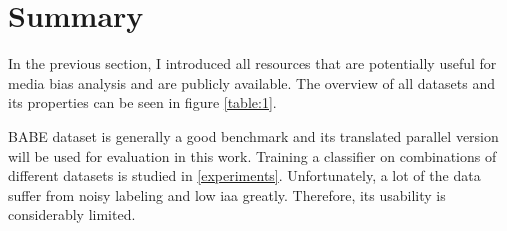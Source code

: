 \section{Summary}
In the previous section, I introduced all resources that are potentially useful for media bias analysis and are publicly available. The overview of all datasets and its properties can be seen in figure \ref{table:1}.

BABE dataset is generally a good benchmark and its translated parallel version will be used for evaluation in this work. Training a classifier on combinations of different datasets is studied in \ref{experiments}. Unfortunately, a lot of the data suffer from noisy labeling and low \gls{iaa} greatly. Therefore, its usability is considerably limited.
